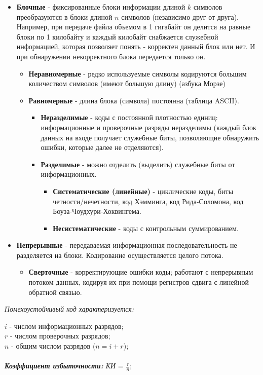 \begin{itemize}
\item \textbf{Блочные} - фиксированные блоки информации длиной $k$ символов преобразуются в блоки длиной $n$ символов (независимо друг от друга). Например, при передаче файла объемом в 1 гигабайт он делится на равные блоки по 1 килобайту и каждый килобайт снабжается служебной информацией, которая позволяет понять - корректен данный блок или нет. И при обнаружении некорректного блока передается только он.
    \begin{itemize}
      \item \textbf{Неравномерные} - редко используемые символы кодируются большим количеством символов (имеют большую длину) (азбука Морзе)
      \item \textbf{Равномерные} - длина блока (символа) постоянна (таблица ASCII).
      \begin{itemize}
        \item \textbf{Неразделимые} - коды с постоянной плотностью единиц: информационные и проверочные разряды неразделимы (каждый блок данных на входе получает служебные биты, позволяющие обнаружить ошибки, которые далее не отделяются).
        \item \textbf{Разделимые} - можно отделить (выделить) служебные биты от информационных.
        \begin{itemize}
          \item \textbf{Систематические (линейные)} - циклические коды, биты четности/нечетности, код Хэмминга, код Рида-Соломона, код Боуза-Чоудхури-Хоквингема.
          \item \textbf{Несистематические} - коды с контрольным суммированием.
        \end{itemize}
      \end{itemize}
    \end{itemize}
\item \textbf{Непрерывные} - передаваемая информационная последовательность не разделяется на блоки. Кодирование осуществляется целого потока.
    \begin{itemize}
     \item \textbf{Сверточные} - корректирующие ошибки коды; работают с непрерывным потоком данных, кодируя их при помощи регистров сдвига с линейной обратной связью.
     \end{itemize}
\end{itemize}
\begin{center}
\emph{Помехоустойчивый код характеризуется:}
\end{center}
$i$ - числом информационных разрядов;
\\$r$ - числом проверочных разрядов;
\\$n$ - общим числом разрядов ($n = i + r$);
\\
\\\emph{\textbf{Коэффициент избыточности:} КИ} = $\frac{r}{n}$;

